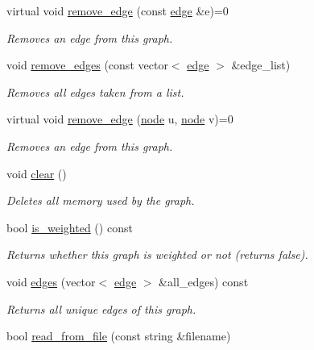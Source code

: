 \begin{DoxyCompactItemize}
virtual void \hyperlink{classlgraph_1_1utils_1_1uxgraph_a4773c30a317dd2cdc7fc3f2edaca4e9e}{remove\+\_\+edge} (const \hyperlink{namespacelgraph_1_1utils_a6510284ce1b1ae5dc97ce5d2de426e10}{edge} \&e)=0
\begin{DoxyCompactList}\small\item\em Removes an edge from this graph. \end{DoxyCompactList}\item 
void \hyperlink{classlgraph_1_1utils_1_1uxgraph_a83e447e3c405700f36a1cce1c227f3f1}{remove\+\_\+edges} (const vector$<$ \hyperlink{namespacelgraph_1_1utils_a6510284ce1b1ae5dc97ce5d2de426e10}{edge} $>$ \&edge\+\_\+list)
\begin{DoxyCompactList}\small\item\em Removes all edges taken from a list. \end{DoxyCompactList}\item 
virtual void \hyperlink{classlgraph_1_1utils_1_1uxgraph_a0f6d277efcb347ef085ddcdf5ae2da84}{remove\+\_\+edge} (\hyperlink{namespacelgraph_1_1utils_a7bd66ede3805ef121bc2835bd48de0cf}{node} u, \hyperlink{namespacelgraph_1_1utils_a7bd66ede3805ef121bc2835bd48de0cf}{node} v)=0
\begin{DoxyCompactList}\small\item\em Removes an edge from this graph. \end{DoxyCompactList}\item 
void \hyperlink{classlgraph_1_1utils_1_1uxgraph_ae76c83683dc7527fe5394d67437a7107}{clear} ()
\begin{DoxyCompactList}\small\item\em Deletes all memory used by the graph. \end{DoxyCompactList}\item 
bool \hyperlink{classlgraph_1_1utils_1_1uxgraph_ae1c3f40bb80ab20c2de96735ccde7b3f}{is\+\_\+weighted} () const \hypertarget{classlgraph_1_1utils_1_1uxgraph_ae1c3f40bb80ab20c2de96735ccde7b3f}{}\label{classlgraph_1_1utils_1_1uxgraph_ae1c3f40bb80ab20c2de96735ccde7b3f}

\begin{DoxyCompactList}\small\item\em Returns whether this graph is weighted or not (returns false). \end{DoxyCompactList}\item 
void \hyperlink{classlgraph_1_1utils_1_1uxgraph_ade877f3a9cf71d844cfe7b6c4f8aae10}{edges} (vector$<$ \hyperlink{namespacelgraph_1_1utils_a6510284ce1b1ae5dc97ce5d2de426e10}{edge} $>$ \&all\+\_\+edges) const 
\begin{DoxyCompactList}\small\item\em Returns all unique edges of this graph. \end{DoxyCompactList}\item 
bool \hyperlink{classlgraph_1_1utils_1_1uxgraph_a8328003e12383f0ff3f344aa6a239345}{read\+\_\+from\+\_\+file} (const string \&filename)\hypertarget{classlgraph_1_1utils_1_1uxgraph_a8328003e12383f0ff3f344aa6a239345}{}\label{classlgraph_1_1utils_1_1uxgraph_a8328003e12383f0ff3f344aa6a239345}


\end{DoxyCompactItemize}
